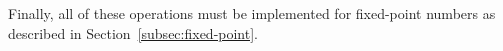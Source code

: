





Finally, all of these operations must be implemented for fixed-point numbers as described in Section~\ref{subsec:fixed-point}.
